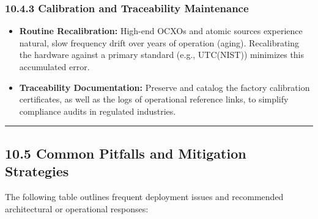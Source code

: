\subsubsection{10.4.3 Calibration and Traceability
Maintenance}\label{calibration-and-traceability-maintenance}

\begin{itemize}
\tightlist
\item
  \textbf{Routine Recalibration:} High-end OCXOs and atomic sources
  experience natural, slow frequency drift over years of operation
  (aging). Recalibrating the hardware against a primary standard (e.g.,
  UTC(NIST)) minimizes this accumulated error.
\item
  \textbf{Traceability Documentation:} Preserve and catalog the factory
  calibration certificates, as well as the logs of operational reference
  links, to simplify compliance audits in regulated industries.
\end{itemize}

\begin{center}\rule{0.5\linewidth}{0.5pt}\end{center}

\subsection{10.5 Common Pitfalls and Mitigation
Strategies}\label{common-pitfalls-and-mitigation-strategies}

The following table outlines frequent deployment issues and recommended
architectural or operational responses:


